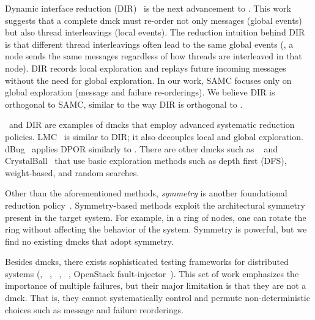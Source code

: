 

Dynamic interface reduction (DIR)~\cite{Guo+11-Demeter} is the next
advancement to \modist.  This work suggests that a complete dmck must
re-order not only messages (global events) but also thread
interleavings (local events).  The reduction intuition behind DIR is
that different thread interleavings often lead to the same global
events (\eg, a node sends the same messages regardless of how threads are
interleaved in that node).  DIR records local exploration and replays
future incoming messages without the need for global exploration.  
In our work, SAMC focuses only on global exploration (message and failure
re-orderings).  We believe DIR is orthogonal to SAMC, similar to the
way DIR is orthogonal to \modist.


\modist\ and DIR are examples of dmcks that employ advanced systematic
reduction policies.  LMC~\cite{Guerraoui+11-McNoNetwork} is similar to
DIR; it also decouples local and global exploration.
dBug~\cite{Simsa+10-Dbug} applies DPOR similarly to \modist.  There are
other dmcks such as \macemc~\cite{Killian+07-LifeDeathMaceMC} and
CrystalBall~\cite{Yabandeh+09-CrystalBall} that use basic exploration
methods such as depth first (DFS), weight-based,
and random searches.

Other than the aforementioned methods, {\em symmetry} is another
foundational reduction policy~\cite{Emerson+97-PorAndSym,
  Prasad+00-SymBasedMc}.  Symmetry-based methods exploit the
architectural symmetry present in the target system.  For example, in
a ring of nodes, one can rotate the ring without affecting
the behavior of the system.  Symmetry is powerful, but 
we find no existing dmcks that adopt symmetry.

Besides dmcks, there exists sophisticated testing frameworks for
distributed systems (\eg, \fate~\cite{Gunawi+11-FateDestini},
\prefail~\cite{Joshi+11-PreFail},
\setsudo~\cite{Joshi+13-SetsudoTesting}, OpenStack
fault-injector~\cite{Ju+13-FaultResOpenStack}). This set of work
emphasizes the importance of multiple failures, but their major
limitation is that they are not a dmck.  That is, they cannot
systematically control and permute non-deterministic choices such as
message and failure reorderings.


